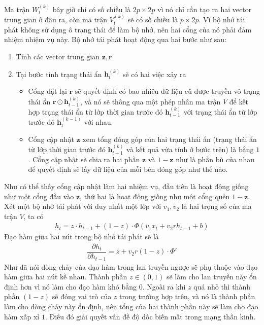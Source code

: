Ma trận $W_t^{(k)}$ bây giờ chỉ có số chiều là $2p\times 2p$ vì nó chỉ cần tạo ra hai vector trung gian ở đầu ra, còn ma trận $V_t^{(k)}$ sẽ có số chiều là $p\times 2p$. Vì bộ nhớ tái phát không sử dụng ô trạng thái để làm bộ nhớ, nên hai cổng của nó phải đảm nhiệm nhiệm vụ này. Bộ nhớ tái phát hoạt động qua hai bước như sau:
\begin{enumerate}
    \item Tính các vector trung gian $\mathbf{z,r}$
    \item Tại bước tính trạng thái ẩn $\mathbf h_t^{(k)}$ sẽ có hai việc xảy ra
          \begin{itemize}
              \item Cổng đặt lại $\mathbf r$ sẽ quyết định có bao nhiêu dữ liệu cũ được truyền vô trạng thái ẩn $\mathbf r\odot\mathbf h_{t-1}^{(k)}$, và nó sẽ thông qua một phép nhân ma trận $V$ để kết hợp trạng thái ẩn từ lớp thời gian trước đó $\mathbf h_{t-1}^{(k)}$ với trạng thái ẩn từ lớp trước đó $\mathbf h_{t}^{(k-1)}$ với nhau.
              \item Cổng cập nhật $\mathbf z$ xem tổng đóng góp của hai trạng thái ẩn (trạng thái ẩn từ lớp thời gian trước đó $\mathbf h_{t-1}^{(k)}$ và kết quả vừa tính ở bước trên) là bằng $1$. Cổng cập nhật sẽ chia ra hai phần $\mathbf z$ và $1-\mathbf z$ như là phần bù của nhau để quyết định sẽ lấy dữ liệu của mỗi bên đóng góp như thế nào.
          \end{itemize}
\end{enumerate}

Như có thể thấy cổng cập nhật làm hai nhiệm vụ, đầu tiên là hoạt động giống như một cổng đầu vào $\mathbf z$, thứ hai là hoạt động giống như một cổng quên $1-\mathbf z$. Xét một bộ nhớ tái phát với duy nhất một lớp với $v_1,v_2$ là hai trọng số của ma trận $V$, ta có
\begin{align}
    h_t=z\cdot h_{t-1}+(1-z)\cdot\Phi(v_1x_t+v_2rh_{t-1}+b)
\end{align}
Đạo hàm giữa hai nút trong bộ nhớ tái phát sẽ là
\begin{align}
    \dfrac{\partial h_t}{\partial h_{t-1}}=z+v_2r(1-z)\cdot\Phi'
\end{align}
Như đã nói dòng chảy của đạo hàm trong lan truyền ngược sẽ phụ thuộc vào đạo hàm giữa hai nút kề nhau. Thành phần $z\in(0,1)$ sẽ làm cho lan truyền này ổn định hơn vì nó làm cho đạo hàm khó bằng $0$. Ngoài ra khi $z$ quá nhỏ thì thành phần $(1-z)$ sẽ đóng vai trò của $z$ trong trường hợp trên, và nó là thành phần làm cho dòng chảy này ổn định, nên tổng của hai thành phần này sẽ làm cho đạo hàm xấp xỉ $1$. Điều đó giải quyết vấn đề độ dốc biến mất trong mạng thần kinh.
